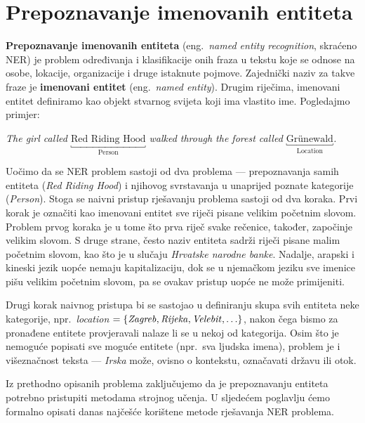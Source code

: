 \documentclass[a4paper,twoside,12pt]{memoir} %
\newcommand{\ti}[1]{\textit{#1\/}}
\newcommand{\tb}{\textbf}
\begin{document}
	\section{Prepoznavanje imenovanih entiteta}

	\tb{Prepoznavanje imenovanih entiteta} (eng.~\ti{named entity recognition}, skraćeno NER) je problem određivanja i klasifikacije onih fraza u tekstu koje se odnose na osobe, lokacije, organizacije i druge istaknute pojmove. Zajednički naziv za takve fraze je \tb{imenovani entitet} (eng.~\ti{named entity}). Drugim riječima, imenovani entitet definiramo kao objekt stvarnog svijeta koji ima vlastito ime. Pogledajmo primjer:

	\bigskip

	\ti{The girl called $\underbracket{\text{Red Riding Hood}}_{\text{Person}}$ walked through the forest called $\underbracket{\text{Grünewald}}_{\text{Location}}$.}

	\bigskip

	Uočimo da se NER problem sastoji od dva problema --- prepoznavanja samih entiteta (\ti{Red Riding Hood}) i njihovog svrstavanja u unaprijed poznate kategorije (\ti{Person}). Stoga se naivni pristup rješavanju problema sastoji od dva koraka. Prvi korak je označiti kao imenovani entitet sve riječi pisane velikim početnim slovom. Problem prvog koraka je u tome što prva riječ svake rečenice, također, započinje velikim slovom. S druge strane, često naziv entiteta sadrži riječi pisane malim početnim slovom, kao što je u slučaju \ti{Hrvatske narodne banke}. Nadalje, arapski i kineski jezik uopće nemaju kapitalizaciju, dok se u njemačkom jeziku sve imenice pišu velikim početnim slovom, pa se ovakav pristup uopće ne može primijeniti.

	Drugi korak naivnog pristupa bi se sastojao u definiranju skupa svih entiteta neke kategorije, npr.\ \ti{location} $= \{\ti{Zagreb}, \ti{Rijeka}, \ti{Velebit}, \ldots\}$, nakon čega bismo za pronađene entitete provjeravali nalaze li se u nekoj od kategorija. Osim što je nemoguće popisati sve moguće entitete (npr.\ sva ljudska imena), problem je i višeznačnost teksta --- \ti{Irska} može, ovisno o kontekstu, označavati državu ili otok.

	Iz prethodno opisanih problema zaključujemo da je prepoznavanju entiteta potrebno pristupiti metodama strojnog učenja. U sljedećem poglavlju ćemo formalno opisati danas najčešće korištene metode rješavanja NER problema.
\end{document}
